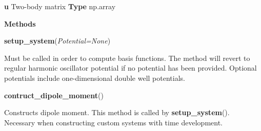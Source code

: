 \begin{tcolorbox}
{    \hspace{2em} \textbf{u}
    Two-body matrix
    \textbf{Type} np.array

    \vspace{1em}
    \textbf{Methods}

    \hspace{2em} \textbf{setup\_system}(\emph{Potential=None})
        \begin{adjustwidth}{4em}{}
        Must be called in order to compute basis functions. The method will 
        revert to regular harmonic oscillator potential if no potential has been 
        provided. Optional potentials include one-dimensional double well potentials.           
        \end{adjustwidth}
   
    \hspace{2em} \textbf{contruct\_dipole\_moment}()
        \begin{adjustwidth}{4em}{}
        Constructs dipole moment. This method is called by
        \textbf{setup\_system}(). Necessary when constructing custom systems with 
        time development.
        \end{adjustwidth}
    }
\end{tcolorbox}
